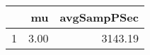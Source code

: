 \begin{table}[h]
\centering
\begin{tabular}{rrr}
  \hline
 & mu & avgSampPSec \\ 
  \hline
1 & 3.00 & 3143.19 \\ 
   \hline
\end{tabular}
\end{table}
